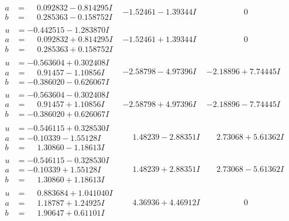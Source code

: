 \documentclass[1p]{elsarticle_modified}
\theoremstyle{definition}
\begin{document}
$$\begin{array}{c|c|c}
\begin{aligned}
a &= \phantom{-}0.092832 - 0.814295 I \\
b &= \phantom{-}0.285363 - 0.158752 I\end{aligned}
 & -1.52461 - 1.39344 I & \phantom{-0.000000 } 0 \\ \hline\begin{aligned}
u &= -0.442515 - 1.283870 I \\
a &= \phantom{-}0.092832 + 0.814295 I \\
b &= \phantom{-}0.285363 + 0.158752 I\end{aligned}
 & -1.52461 + 1.39344 I & \phantom{-0.000000 } 0 \\ \hline\begin{aligned}
u &= -0.563604 + 0.302408 I \\
a &= \phantom{-}0.91457 - 1.10856 I \\
b &= -0.386020 - 0.626067 I\end{aligned}
 & -2.58798 - 4.97396 I & -2.18896 + 7.74445 I \\ \hline\begin{aligned}
u &= -0.563604 - 0.302408 I \\
a &= \phantom{-}0.91457 + 1.10856 I \\
b &= -0.386020 + 0.626067 I\end{aligned}
 & -2.58798 + 4.97396 I & -2.18896 - 7.74445 I \\ \hline\begin{aligned}
u &= -0.546115 + 0.328530 I \\
a &= -0.10339 - 1.55128 I \\
b &= \phantom{-}1.30860 - 1.18613 I\end{aligned}
 & \phantom{-}1.48239 - 2.88351 I & \phantom{-}2.73068 + 5.61362 I \\ \hline\begin{aligned}
u &= -0.546115 - 0.328530 I \\
a &= -0.10339 + 1.55128 I \\
b &= \phantom{-}1.30860 + 1.18613 I\end{aligned}
 & \phantom{-}1.48239 + 2.88351 I & \phantom{-}2.73068 - 5.61362 I \\ \hline\begin{aligned}
u &= \phantom{-}0.883684 + 1.041040 I \\
a &= \phantom{-}1.18787 + 1.24925 I \\
b &= \phantom{-}1.90647 + 0.61101 I\end{aligned}
 & \phantom{-}4.36936 + 4.46912 I & \phantom{-0.000000 } 0 \\ \hline\begin{aligned}

\end{aligned}
\end{array}$$
\end{document}
